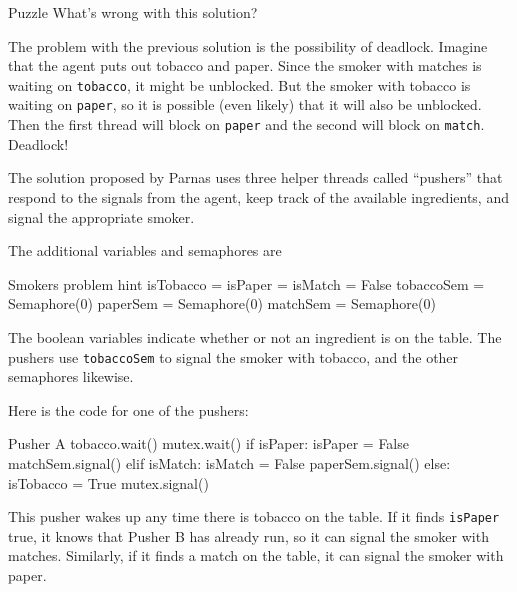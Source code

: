 \begin{puzzlebox}{Puzzle}
What's wrong with this solution?


The problem with the previous solution is the possibility
of deadlock.  Imagine that the agent puts out tobacco and
paper.  Since the smoker with matches is waiting on {\tt tobacco},
it might be unblocked.  But the smoker with tobacco is
waiting on {\tt paper}, so it is possible (even likely) that
it will also be unblocked.  Then the first thread will block
on {\tt paper} and the second will block on {\tt match}.
Deadlock!


The solution proposed by Parnas uses three helper threads
called ``pushers'' that respond to the signals from the agent,
keep track of the available ingredients, and signal the
appropriate smoker.

The additional variables and semaphores are

\begin{lstbox}{Smokers problem hint}
isTobacco = isPaper = isMatch = False
tobaccoSem = Semaphore(0)
paperSem = Semaphore(0)
matchSem = Semaphore(0)
\end{lstbox}

The boolean variables indicate whether or not an ingredient
is on the table.  The pushers use {\tt tobaccoSem} to signal
the smoker with tobacco, and the other semaphores likewise.
\end{puzzlebox}



Here is the code for one of the pushers:

\begin{lstbox}{Pusher A}
tobacco.wait()
mutex.wait()
    if isPaper:
        isPaper = False
        matchSem.signal()
    elif isMatch:
        isMatch = False
        paperSem.signal()
    else: 
        isTobacco = True
mutex.signal()
\end{lstbox}

This pusher wakes up any time there is tobacco on the
table.  If it finds {\tt isPaper} true, it knows that
Pusher B has already run, so it can signal the smoker
with matches.  Similarly, if it finds a match on the
table, it can signal the smoker with paper.

